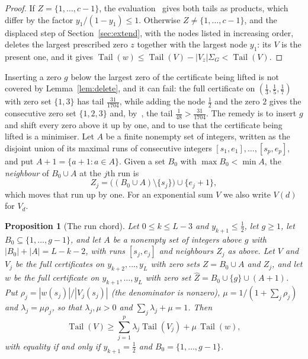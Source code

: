 \documentclass[11pt]{article}
\newtheorem{proposition}[theorem]{Proposition}
\theoremstyle{definition}
\theoremstyle{plain}
\DeclareMathOperator{\Tail}{Tail}
\begin{document}
\begin{proof}
If $Z=\{1,\ldots,c-1\}$, the evaluation~\cite[Lemma~2.1]{coefficient-mass} gives both tails as products, which
differ by the factor $y_1/(1-y_1)\le1$.  Otherwise
$Z\ne\{1,\ldots,c-1\}$, and the displaced step of
Section~\ref{sec:extend}, with the nodes listed in increasing order, deletes
the largest prescribed zero $z$ together with the largest node $y_1$: its $V$
is the present one, and it gives
$\Tail(w)\le\Tail(V)-|V_z|\Sigma_G<\Tail(V)$.
\end{proof}

Inserting a zero $g$ below the largest zero of the certificate being lifted
is not covered by Lemma~\ref{lem:delete}, and it can fail: the full
certificate on $(\tfrac13,\tfrac15,\tfrac17)$ with zero set $\{1,3\}$ has tail
$\tfrac{31}{1704}$, while adding the node $\tfrac12$ and the zero $2$ gives the
consecutive zero set $\{1,2,3\}$ and, by~\cite[Lemma~2.1]{coefficient-mass}, the tail
$\tfrac1{48}>\tfrac{31}{1704}$.  The remedy is to insert $g$ and shift every
zero above it up by one, and to use that the certificate being lifted is a
minimiser.  Let $A$ be a finite nonempty set of integers, written as the
disjoint union of its maximal runs of consecutive integers
$[s_1,e_1],\ldots,[s_p,e_p]$, and put $A+1=\{a+1:a\in A\}$.  Given a set
$B_0$ with $\max B_0<\min A$, the \emph{neighbour} of $B_0\cup A$ at the $j$th
run is
\[
  Z_j=\bigl((B_0\cup A)\setminus\{s_j\}\bigr)\cup\{e_j+1\},
\]
which moves that run up by one.  For an exponential sum $V$ we also write
$V(d)$ for $V_d$.

\begin{proposition}[The run chord]\label{prop:runchord}
Let $0\le k\le L-3$ and $y_{k+1}\le\tfrac12$, let $g\ge1$, let
$B_0\subseteq\{1,\ldots,g-1\}$, and let $A$ be a nonempty set of integers
above $g$ with $|B_0|+|A|=L-k-2$, with runs $[s_j,e_j]$ and neighbours $Z_j$
as above.  Let $V$ and $V_j$ be the full certificates on
$y_{k+2},\ldots,y_L$ with zero sets $Z=B_0\cup A$ and $Z_j$, and let $w$ be
the full certificate on $y_{k+1},\ldots,y_L$ with zero set
$\widehat Z=B_0\cup\{g\}\cup(A+1)$.  Put $\rho_j=|w(s_j)|/|V_j(s_j)|$ (the
denominator is nonzero), $\mu=1/(1+\sum_j\rho_j)$ and $\lambda_j=\mu\rho_j$,
so that $\lambda_j,\mu>0$ and $\sum_j\lambda_j+\mu=1$.  Then
\begin{equation}\label{eq:runchord}
  \Tail(V)\ge\sum_{j=1}^p\lambda_j\Tail(V_j)+\mu\,\Tail(w),
\end{equation}
with equality if and only if $y_{k+1}=\tfrac12$ and $B_0=\{1,\ldots,g-1\}$.
\end{proposition}
\end{document}
